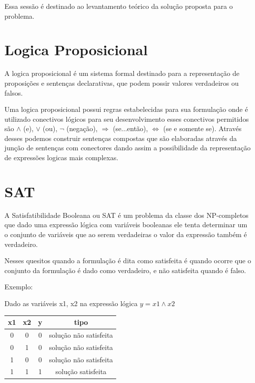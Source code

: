Essa sessão é destinado ao levantamento teórico da solução proposta para o problema.

\section{Logica Proposicional}

A logica proposicional é um sistema formal destinado para a representação de proposições e sentenças declarativas, que podem possir valores verdadeiros ou falsos.

Uma logica proposicional possui regras estabelecidas para sua formulação onde é utilizado conectivos lógicos para seu desenvolvimento esses conectivos permitidos são $\land$ (e), $\lor$ (ou), $\lnot$ (negação), $\Rightarrow$ (se...então), $\iff$ (se e somente se). Através desses podemos construir sentenças compostas que são elaboradas através da junção de sentenças com conectores dando assim a possibilidade da representação de expressões logicas mais complexas.


\section{SAT}

A Satisfatibilidade Booleana ou SAT é um problema da classe dos NP-completos que dado uma expressão lógica com variáveis booleanas ele tenta determinar um o conjunto de variáveis que ao serem verdadeiras o valor da expressão também é verdadeiro.

Nesses quesitos quando a formulação é dita como satisfeita é quando ocorre que o conjunto da formulação é dado como verdadeiro, e não satisfeita quando é falso. 
 


Exemplo:
 
Dado as variáveis x1, x2 na expressão lógica $y = x1 \land x2$

\begin{center}
\begin{tabular}{ |c|c|c|c| } 
\hline
x1 & x2 & y & tipo\\
\hline
0 & 0  & 0 & solução não satisfeita \\ 
0 & 1 & 0  & solução não satisfeita \\ 
1 & 0 & 0  & solução não satisfeita \\
1 & 1 & 1  & solução satisfeita \\
\hline
\end{tabular}
\end{center}

